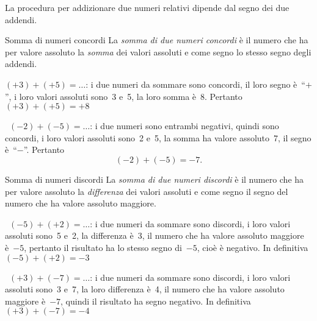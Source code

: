 La procedura per addizionare due numeri relativi dipende dal segno dei due 
addendi.

\begin{definizione}{Somma di numeri concordi}{}
La \emph{somma di due numeri concordi} è il numero che 
ha per valore assoluto la \emph{somma} dei valori 
assoluti e come segno lo stesso segno degli addendi.
\end{definizione}

\begin{esempio}{}{}
\( (+3)+(+5)=\ldots\): i due numeri da sommare sono concordi, 
il loro segno è~``\(+\)'', i loro valori assoluti sono~3 e~5,
la loro somma è~8. Pertanto~\((+3)+(+5)=+8\)
\end{esempio}

\begin{esempio}{}{}
~\((-2)+(-5)=\ldots\): i due numeri sono entrambi negativi, quindi sono 
concordi, 
i loro valori assoluti sono~2 e~5,
la somma ha valore assoluto~7, il segno è~``\(-\)''. Pertanto
\[(-2)+(-5)=-7.\]
\end{esempio}

\begin{definizione}{Somma di numeri discordi}{}
La \emph{somma di due numeri discordi} è il numero che ha 
per valore assoluto la \emph{differenza} dei valori assoluti
e come segno il segno del numero che ha valore assoluto maggiore.
\end{definizione}

\begin{esempio}{}{}
~\((-5)+(+2)=\ldots\): i due numeri da sommare sono discordi, i loro valori 
assoluti sono~5 e~2, la differenza è~3,
il numero che ha valore assoluto maggiore è~\(-5\), pertanto il risultato 
ha lo stesso segno di~\(-5\), cioè è negativo.
In definitiva~\((-5)+(+2)=-3\)
\end{esempio}


\begin{esempio}{}{}
~\((+3)+(-7)=\ldots\): i due numeri da sommare sono discordi, i loro valori 
assoluti sono~3 e~7, la loro differenza è~4,
il numero che ha valore assoluto maggiore è~\(-7\), quindi il risultato ha 
segno negativo.
In definitiva~\((+3)+(-7)=-4\)
\end{esempio}

